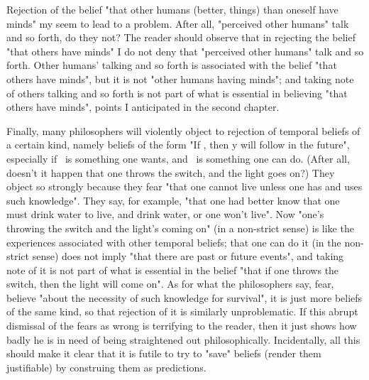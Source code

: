 \documentclass[10pt,twoside]{memoir}
\begin{document}
\begin{enumerate}
{Rejection of the belief "that other humans (better, things) than oneself 
have minds" my seem to lead to a problem. After all, "perceived other 
humans" talk and so forth, do they not? The reader should observe that in 
rejecting the belief "that others have minds" I do not deny that "perceived 
other humans" talk and so forth. Other humans' talking and so forth is 
associated with the belief "that others have minds", but it is not "other 
humans having minds"; and taking note of others talking and so forth is not 
part of what is essential in believing "that others have minds", points I 
anticipated in the second chapter. 

Finally, many philosophers will violently object to rejection of 
temporal beliefs of a certain kind, namely beliefs of the form "If \x, then y 
will follow in the future", especially if \y\ is something one wants, and \x\ is 
something one can do. (After all, doesn't it happen that one throws the 
switch, and the light goes on?) They object so strongly because they fear 
"that one cannot live unless one has and uses such knowledge". They say, 
for example, "that one had better know that one must drink water to live, 
and drink water, or one won't live". Now "one's throwing the switch and the 
light's coming on" (in a non-strict sense) is like the experiences associated 
with other temporal beliefs; that one can do it (in the non-strict sense) does 
not imply "that there are past or future events", and taking note of it is not 
part of what is essential in the belief "that if one throws the switch, then the 
light will come on". As for what the philosophers say, fear, believe "about 
the necessity of such knowledge for survival", it is just more beliefs of the 
same kind, so that rejection of it is similarly unproblematic. If this abrupt 
dismissal of the fears as wrong is terrifying to the reader, then it just shows 
how badly he is in need of being straightened out philosophically. 
Incidentally, all this should make it clear that it is futile to try to "save" 
beliefs (render them justifiable) by construing them as predictions. 

}
\end{enumerate}
\end{document}
